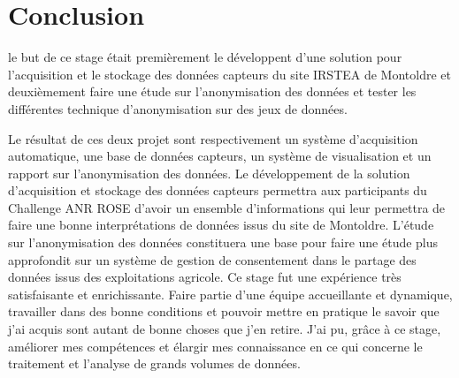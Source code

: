 \section{Conclusion}
le but de ce stage était premièrement le développent d'une solution pour l'acquisition et le stockage des données capteurs du site IRSTEA de Montoldre et deuxièmement faire une étude sur l'anonymisation des données et tester les différentes technique d'anonymisation sur des jeux de données.

Le résultat de ces deux projet sont respectivement un système d'acquisition automatique, une base de données capteurs, un système de visualisation et un rapport sur l'anonymisation des données. Le développement de la solution d'acquisition et stockage des données capteurs permettra aux participants du Challenge ANR ROSE d'avoir un ensemble d'informations qui leur permettra de faire une bonne interprétations de données issus du site de Montoldre. L'étude sur l'anonymisation des données constituera une base pour faire une étude plus approfondit sur un système de gestion de consentement dans le partage des données issus des exploitations agricole.
Ce stage fut une expérience très satisfaisante et enrichissante. Faire partie d'une équipe accueillante et dynamique, travailler dans des bonne conditions et pouvoir mettre en pratique le savoir que j'ai acquis sont autant de bonne choses que j'en retire.
J'ai pu, grâce à ce stage, améliorer mes compétences et élargir mes connaissance en ce qui concerne le traitement et l'analyse de grands volumes de  données.
